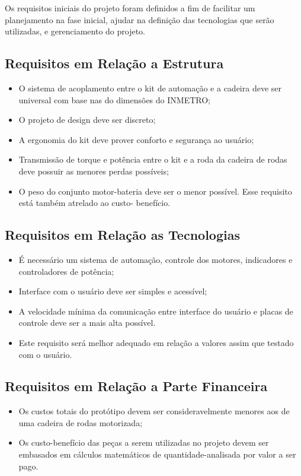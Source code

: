 Os requisitos iniciais do projeto foram definidos a fim de facilitar um planejamento na fase inicial, ajudar na definição das tecnologias que serão utilizadas, e gerenciamento do projeto.

\subsection{Requisitos em Relação a Estrutura}

  \begin{itemize}
    \item O sistema de acoplamento entre o kit de automação e a cadeira deve ser universal com base nas do dimensões do INMETRO;
    \item O projeto de design deve ser discreto;
    \item A ergonomia do kit deve prover conforto e segurança ao usuário;
    \item Transmissão de torque e potência entre o kit e a roda da cadeira de rodas deve possuir as menores perdas possíveis;
    \item O peso do conjunto motor-bateria deve ser o menor possível. Esse requisito está também atrelado ao custo- benefício.

  \end{itemize}

\subsection{Requisitos em Relação as Tecnologias}

  \begin{itemize}
    \item É necessário um sistema de automação, controle dos motores, indicadores e controladores de potência;
    \item Interface com o usuário deve ser simples e acessível;
    \item A velocidade mínima da comunicação entre interface do usuário e placas de controle deve ser a mais alta possível. \item Este requisito será melhor adequado em relação a valores assim que testado com o usuário.
  \end{itemize}

\subsection{Requisitos em Relação a Parte Financeira}
  \begin{itemize}
    \item Os custos totais do protótipo devem ser consideravelmente menores aos de uma cadeira de rodas motorizada;
    \item Os custo-benefício das peças a serem utilizadas no projeto devem ser embasados em cálculos matemáticos de quantidade-analisada por valor a ser pago.
  \end{itemize}
